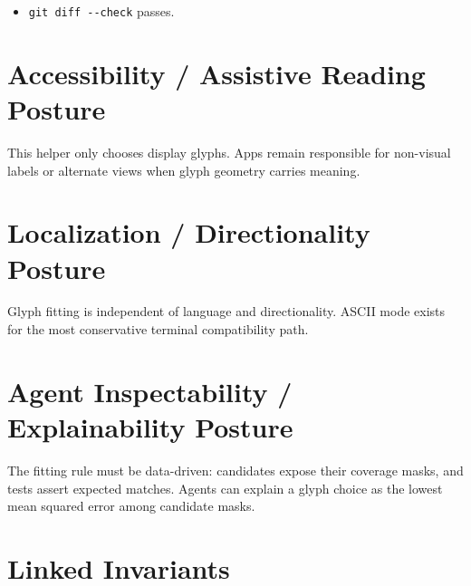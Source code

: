 \begin{itemize}
  \texttt{n\allowbreak{}p\allowbreak{}m\allowbreak{} \allowbreak{}r\allowbreak{}u\allowbreak{}n\allowbreak{} \allowbreak{}l\allowbreak{}i\allowbreak{}n\allowbreak{}t\allowbreak{} \allowbreak{}-\allowbreak{}-\allowbreak{}w\allowbreak{}o\allowbreak{}r\allowbreak{}k\allowbreak{}s\allowbreak{}p\allowbreak{}a\allowbreak{}c\allowbreak{}e\allowbreak{} \allowbreak{}@\allowbreak{}f\allowbreak{}l\allowbreak{}y\allowbreak{}i\allowbreak{}n\allowbreak{}g\allowbreak{}r\allowbreak{}o\allowbreak{}b\allowbreak{}o\allowbreak{}t\allowbreak{}s\allowbreak{}/\allowbreak{}b\allowbreak{}i\allowbreak{}j\allowbreak{}o\allowbreak{}u\allowbreak{}-\allowbreak{}t\allowbreak{}u\allowbreak{}i} passes.
\item
  \texttt{g\allowbreak{}i\allowbreak{}t\allowbreak{} \allowbreak{}d\allowbreak{}i\allowbreak{}f\allowbreak{}f\allowbreak{} \allowbreak{}-\allowbreak{}-\allowbreak{}c\allowbreak{}h\allowbreak{}e\allowbreak{}c\allowbreak{}k} passes.
\end{itemize}

\section{Accessibility / Assistive Reading Posture}\label{record-160-accessibility-assistive-reading-posture}

This helper only chooses display glyphs. Apps remain responsible for non-visual labels or alternate views when glyph geometry carries meaning.

\section{Localization / Directionality Posture}\label{record-160-localization-directionality-posture}

Glyph fitting is independent of language and directionality. ASCII mode exists for the most conservative terminal compatibility path.

\section{Agent Inspectability / Explainability Posture}\label{record-160-agent-inspectability-explainability-posture}

The fitting rule must be data-driven: candidates expose their coverage masks, and tests assert expected matches. Agents can explain a glyph choice as the lowest mean squared error among candidate masks.

\section{Linked Invariants}\label{record-160-linked-invariants}

